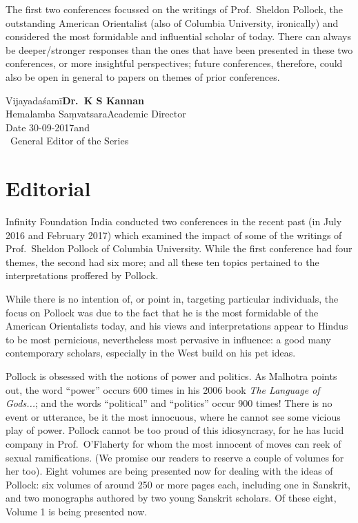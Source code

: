 The first two conferences focussed on the writings of Prof.\ Sheldon Pollock, the outstanding American Orientalist (also of Columbia University, ironically) and considered the most formidable and influential scholar of today. There can always be deeper/stronger responses than the ones that have been presented in these two conferences, or more insightful perspectives; future conferences, therefore, could also be open in general to papers on themes of prior conferences.
\bigskip

\noindent
Vijayadaśamī\hfill	{\bf Dr.~K S Kannan}\\
Hemalamba Saṃvatsara\hfill Academic Director\\
Date 30-09-2017\hfill and\\	
\phantom{.}~\hfill General Editor of the Series                  
               

\chapter*{Editorial}\label{editorial}

\vskip 9pt




Infinity Foundation India conducted two conferences in the recent past (in July 2016 and February 2017) which examined the impact of some of the writings of Prof.\ Sheldon Pollock of Columbia University. While the first conference had four themes, the second had six more; and all these ten topics pertained to the interpretations proffered by Pollock.
\vskip 1.5pt

While there is no intention of, or point in, targeting particular individuals, the focus on Pollock was due to the fact that he is the most formidable of the American Orientalists today, and his views and interpretations appear to Hindus to be most pernicious, nevertheless most pervasive in influence: a good many contemporary scholars, especially in the West  build on his pet ideas. 
\vskip 1.5pt

Pollock is obsessed with the notions of power and politics. As Malhotra points out, the word “power” occurs 600 times in his 2006 book {\sl The Language of Gods...}; and the words “political” and “politics” occur 900 times! There is no event or utterance, be it the most innocuous, where he cannot see some vicious play of power. Pollock cannot be too proud of this idiosyncrasy, for he has lucid company in Prof.\ O’Flaherty for whom the most innocent of moves can reek of sexual ramifications. (We promise our readers to reserve a couple of volumes for her too). Eight volumes are being presented now for dealing with the ideas of Pollock: six volumes of around 250 or more pages each, including one in Sanskrit, and two monographs authored by two young Sanskrit scholars. Of these eight,  Volume 1 is being presented now.
\vskip 1.5pt

